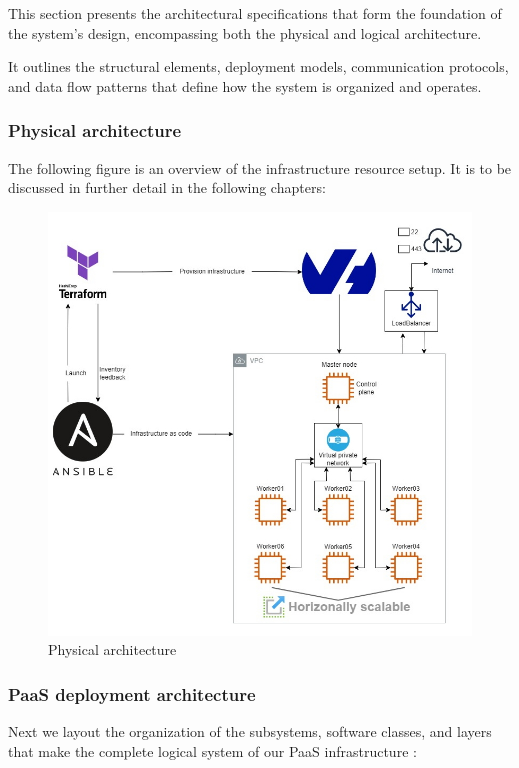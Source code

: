 \hspace{7mm}This section presents the architectural specifications that form the foundation of the system's design, encompassing both the physical and logical architecture.

\hspace{7mm}It outlines the structural elements, deployment models, communication protocols, and data flow patterns that define how the system is organized and operates.

\subsubsection{Physical architecture}

\hspace{7mm}The following figure is an overview of the infrastructure resource setup. It is to be discussed in further detail in the following chapters:

\begin{figure}[H]\centering
\includegraphics[width=1.0\textwidth,angle=00]{assets/f7.jpg}
\caption{Physical architecture}
\label{fig:f7}
\end{figure}

\newpage

\subsubsection{PaaS deployment architecture} 
\hspace{7mm}Next we layout the organization of the subsystems, software classes, and layers that make the complete logical system of our PaaS infrastructure :

